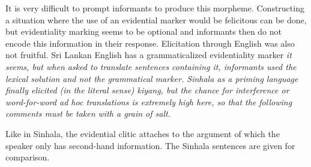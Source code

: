 It is very difficult to prompt informants to produce this morpheme. Constructing a situation where the use of an evidential marker would be felicitous can be done, but evidentiality marking seems to be optional and informants then do not encode this information in their response. Elicitation through English was also not fruitful. Sri Lankan English has a grammaticalized evidentiality marker \em it seems\em, but when asked to translate sentences containing it, informants used the lexical solution  and not the grammatical marker. Sinhala as a priming language finally   elicited (in the literal sense) \em kiyang\em, but the chance for interference or word-for-word \em ad hoc \em translations is extremely high here, so that the following comments must be taken with a grain of salt.

Like in Sinhala, the evidential clitic attaches to the argument of which the speaker only has second-hand information. The Sinhala sentences are given for comparison.

\let\eachwordtwo=\it
\let\eachwordthree=\rm






